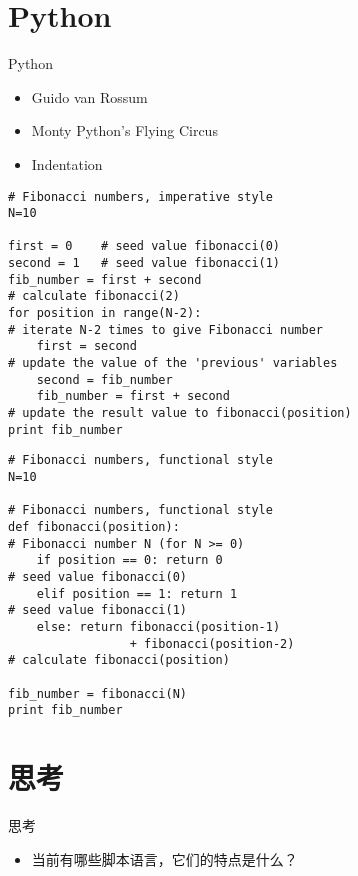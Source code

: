 \section{Python}
\begin{frame}{Python}
\begin{itemize}
\item Guido van Rossum
\item Monty Python's Flying Circus
\item Indentation
\end{itemize}
\end{frame}

\begin{frame}[containsverbatim]{}
\lstset{language=python}
\begin{lstlisting}
# Fibonacci numbers, imperative style
N=10

first = 0    # seed value fibonacci(0)
second = 1   # seed value fibonacci(1)
fib_number = first + second     
# calculate fibonacci(2)
for position in range(N-2):     
# iterate N-2 times to give Fibonacci number
    first = second              
# update the value of the 'previous' variables
    second = fib_number
    fib_number = first + second 
# update the result value to fibonacci(position)
print fib_number
\end{lstlisting}
\end{frame}

\begin{frame}[containsverbatim]{}
\lstset{language=python}
\begin{lstlisting}
# Fibonacci numbers, functional style
N=10
 
# Fibonacci numbers, functional style
def fibonacci(position):  
# Fibonacci number N (for N >= 0)
    if position == 0: return 0    
# seed value fibonacci(0)
    elif position == 1: return 1  
# seed value fibonacci(1)
    else: return fibonacci(position-1) 
                 + fibonacci(position-2)   
# calculate fibonacci(position)
 
fib_number = fibonacci(N)
print fib_number
\end{lstlisting}
\end{frame}




 \section{思考}
 \begin{frame}{思考}
 \begin{itemize}
 \item 当前有哪些脚本语言，它们的特点是什么？
 \end{itemize}
 \end{frame}



